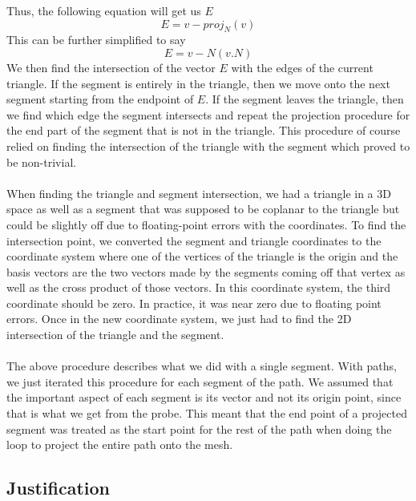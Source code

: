 \documentclass[conference]{acmsiggraph}
\begin{document}
Thus, the following equation will get us $E$
\[
E = v - proj_N(v)
\]
This can be further simplified to say
\[
E = v - N(v.N)
\]
We then find the intersection of the vector $E$ with the edges of the current triangle. If the segment is entirely in the triangle, then we move onto the next segment starting from the endpoint of $E$. If the segment leaves the triangle, then we find which edge the segment intersects and repeat the projection procedure for the end part of the segment that is not in the triangle. This procedure of course relied on finding the intersection of the triangle with the segment which proved to be non-trivial.\\
\\
When finding the triangle and segment intersection, we had a triangle in a 3D space as well as a segment that was supposed to be coplanar to the triangle but could be slightly off due to floating-point errors with the coordinates. To find the intersection point, we converted the segment and triangle coordinates to the coordinate system where one of the vertices of the triangle is the origin and the basis vectors are the two vectors made by the segments coming off that vertex as well as the cross product of those vectors. In this coordinate system, the third coordinate should be zero. In practice, it was near zero due to floating point errors. Once in the new coordinate system, we just had to find the 2D intersection of the triangle and the segment. \\
\\
The above procedure describes what we did with a single segment. With paths, we just iterated this procedure for each segment of the path. We assumed that the important aspect of each segment is its vector and not its origin point, since that is what we get from the probe. This meant that the end point of a projected segment was treated as the start point for the rest of the path when doing the loop to project the entire path onto the mesh.

\subsection{Justification}
\end{document}
